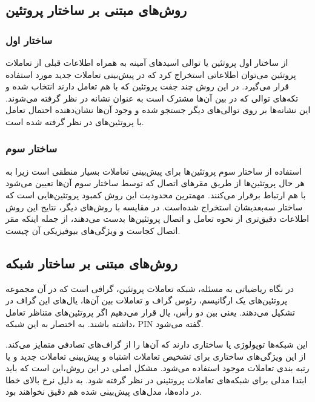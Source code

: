 \subsection{روش‌های مبتنی بر ساختار پروتئین}
\subsubsection{ساختار اول}
از ساختار اول پروتئین یا توالی اسید‌های آمینه به همراه اطلاعات قبلی از تعاملات پروتئین می‌توان اطلاعاتی استخراج کرد که در پیش‌بینی تعاملات جدید مورد استفاده قرار می‌گیرد. در این روش چند جفت پروتئین که با هم تعامل دارند انتخاب شده و تکه‌های توالی که در بین آن‌ها مشترک است به عنوان نشانه در نظر گرفته می‌شوند. این نشانه‌ها بر روی توالی‌های دیگر جستجو شده و وجود آن‌ها نشان‌دهنده احتمال تعامل با پروتئین‌های در نظر گرفته شده است.

\subsubsection{ساختار سوم}
استفاده از ساختار سوم پروتئین‌ها برای پیش‌بینی تعاملات بسیار منطقی است زیرا به هر حال پروتئین‌ها از طریق مقر‌های اتصال که توسط ساختار سوم آن‌ها تعیین می‌شود با هم ارتباط برقرار می‌کنند. مهمترین محدودیت این روش کمبود پروتئین‌هایی است که ساختار سه‌بعدیشان استخراج شده‌است. در مقایسه با روش‌های دیگر، نتایج این روش اطلاعات دقیق‌تری از نحوه تعامل و اتصال پروتئین‌ها بدست می‌دهند، از جمله اینکه مقر اتصال کجاست و ویژگی‌های بیوفیزیکی آن چیست.

\subsection{روش‌های مبتنی بر ساختار شبکه}
در نگاه ریاضیاتی به مسئله، شبکه تعاملات پروتئین، گرافی است که در آن مجموعه
پروتئین‌های یک ارگانیسم، رئوس گراف و تعاملات بین آن‌ها، یال‌های این گراف در تشکیل می‌دهند. یعنی بین دو رأس، یال قرار می‌دهیم اگر پروتئین‌های متناظر تعامل داشته باشند. به اختصار به این شبکه‌، PIN گفته می‌شود.

این شبکه‌ها توپولوژی یا ساختاری دارند که آن‌ها را از گراف‌های تصادفی متمایز می‌کند. از این ویژگی‌های ساختاری برای تشخیص تعاملات اشتباه و پیش‌بینی تعاملات جدید و یا رتبه بندی تعاملات موجود استفاده می‌شود. مشکل اصلی در این روش،این است که باید ابتدا مدلی برای شبکه‌های تعاملات پروتئینی در نظر گرفته شود. به دلیل نرخ بالای خطا در داده‌ها، مدل‌های پیش‌بینی شده هم دقیق نخواهند بود.

